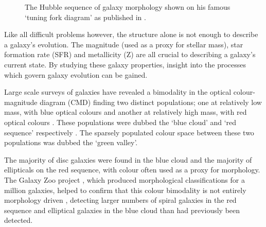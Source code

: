 \begin{figure}
\caption[The Hubble sequence for morphological classification of galaxies]{The Hubble sequence of galaxy morphology shown on his famous `tuning fork diagram' as published in \cite{hubble36}.}
\label{fig:hubble}
\end{figure}

Like all difficult problems however, the structure alone is not enough to describe a galaxy's evolution. The magnitude (used as a proxy for stellar mass), star formation rate (SFR) and metallicity (Z) are all crucial to describing a galaxy's current state. By studying these galaxy properties, insight into the processes which govern galaxy evolution can be gained.

Large scale surveys of galaxies have revealed a bimodality in the optical colour-magnitude diagram (CMD) finding two distinct populations; one at relatively low mass, with blue optical colours and another at relatively high mass, with red optical colours \citep{Baldry04, Baldry06, Willmer06, ball08, Brammer09}. These populations were dubbed the `blue cloud' and `red sequence' respectively \citep{Chester64, bower92, Driver06, Faber07}.  The sparsely populated colour space between these two populations was dubbed the  `green valley'.

The majority of disc galaxies were found in the blue cloud and the majority of ellipticals on the red sequence, with colour often used as a proxy for morphology. The Galaxy Zoo project \citep{Lintott11}, which produced morphological classifications for a million galaxies, helped to confirm that this colour bimodality is not entirely morphology driven \citep{Strat01, Salim07, Sch07, CHV08, Bamford09, Skibba09}, detecting larger numbers of spiral galaxies in the red sequence \citep{masters10c} and elliptical galaxies in the blue cloud \citep{Sch09} than had previously been detected.

